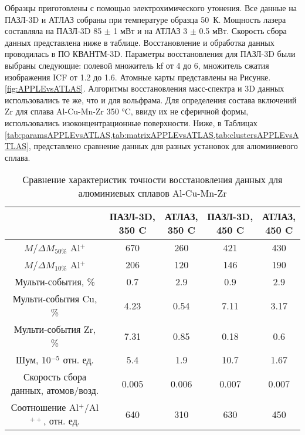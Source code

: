 Образцы приготовлены с помощью электрохимического утонения. Все данные на ПАЗЛ-3D и АТЛАЗ собраны при температуре образца 50~К. Мощность лазера составляла на ПАЗЛ-3D 85 $\pm$ 1 мВт и на АТЛАЗ 3 $\pm$ 0.5 мВт. Скорость сбора данных представлена ниже в таблице. Восстановление и обработка данных проводилась в ПО КВАНТМ-3D. Параметры восстановления для ПАЗЛ-3D были выбраны следующие: полевой множитель kf от 4 до 6, множитель сжатия изображения ICF от 1.2 до 1.6. Атомные карты представлены на Рисунке.  \cref{fig:APPLEvsATLAS}. Алгоритмы восстановления масс-спектра и 3D данных использовались те же, что и для вольфрама. Для определения состава включений Zr для сплава Al-Cu-Mn-Zr 350 °C, ввиду их не сферичной формы, использовались изоконцентрационные поверхности. Ниже, в Таблицах \cref{tab:paramsAPPLEvsATLAS,tab:matrixAPPLEvsATLAS,tab:clustersAPPLEvsATLAS}, представлено сравнение данных для разных установок для алюминиевого сплава.

\begin{table} [htbp]
	\centering
	\caption{Сравнение характеристик точности восстановления данных для алюминиевых сплавов Al-Cu-Mn-Zr}
	\label{tab:paramsAPPLEvsATLAS}
	\begin{SingleSpace}
		\begin{tabular} {| c | c | c | c | c |}
			\hline
			    {} & \thead{ПАЗЛ-3D, \\350 \textdegree C} & \thead{АТЛАЗ, \\350 \textdegree C} & \thead{ПАЗЛ-3D, \\450 \textdegree C} & \thead{АТЛАЗ, \\450 \textdegree C} \\ \hline
			$M/\Delta M_{50\%}$ Al$^+$ & 670  & 260  & 421  & 430               \\ \hline
			$M/\Delta M_{10\%}$ Al$^+$ & 206  & 120  & 146  & 190               \\ \hline
			Мульти-события, \%         & 0.7  & 2.9  & 0.9  & 2.9               \\ \hline
			Мульти-события Cu, \%      & 4.23 & 0.54 & 7.11 & 3.17              \\ \hline
			Мульти-события Zr, \%      & 7.31 & 0.85 & 0.18 & 0.6               \\ \hline
			Шум, 10$^{-5}$ отн. ед. & 5.4   & 1.9   & 10.7  & 1.67  \\ \hline
			Скорость сбора данных, атомов/возд.        & 0.005 & 0.006 & 0.007 & 0.007 \\ \hline
			Соотношение Al$^+$/Al$^{++}$, отн. ед.    & 640   & 310   & 630   & 450   \\ \hline
		\end{tabular}
	\end{SingleSpace}
\end{table}

